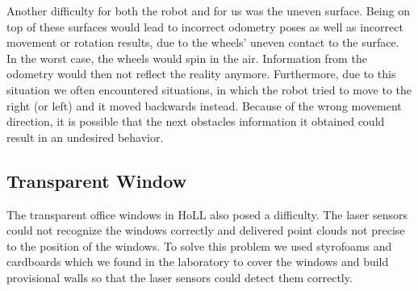 Another difficulty for both the robot and for us was the uneven surface. Being on top of these surfaces would lead to incorrect odometry poses as well as incorrect movement or rotation results, due to the wheels' uneven contact to the surface. In the worst case, the wheels would spin in the air. Information from the odometry would then not reflect the reality anymore. Furthermore, due to this situation we often encountered situations, in which the robot tried to move to the right (or left) and it moved backwards instead. Because of the wrong movement direction, it is possible that the next obstacles information it obtained could result in an undesired behavior.

\subsection{Transparent Window}

The transparent office windows in HoLL also posed a difficulty. The laser sensors could not recognize the windows correctly and delivered point clouds not precise to the position of the windows. To solve this problem we used styrofoams and cardboards which we found in the laboratory to cover the windows and build provisional walls so that the laser sensors could detect them correctly.

